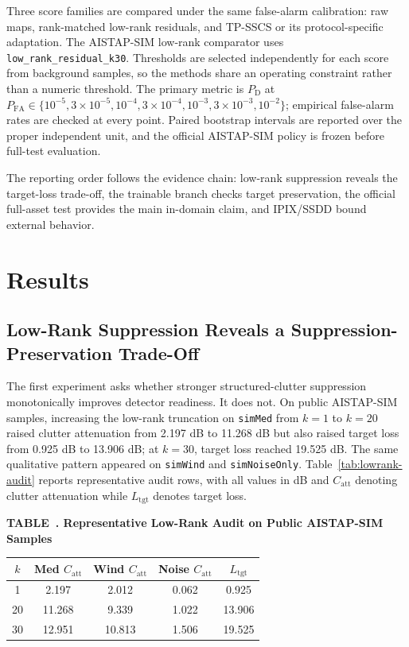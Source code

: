 \documentclass[journal]{IEEEtran}
\newcommand{\SingleColumnTableBlock}[3]{%
  \par\vspace{0.18em}
  \par\noindent\begin{minipage}{\columnwidth}
  \centering
  \refstepcounter{table}\label{#1}%
  {\footnotesize\textbf{TABLE~\thetable. #2}}\\[0.50em]
  #3%
  \end{minipage}
  \par\vspace{0.60em}
}
\begin{document}
Three score families are compared under the same false-alarm calibration: raw maps, rank-matched low-rank residuals, and TP-SSCS or its protocol-specific adaptation. The AISTAP-SIM low-rank comparator uses \texttt{low\_rank\_residual\_k30}. Thresholds are selected independently for each score from background samples, so the methods share an operating constraint rather than a numeric threshold. The primary metric is $P_{\mathrm{D}}$ at $P_{\mathrm{FA}}\in\{10^{-5},3\times10^{-5},10^{-4},3\times10^{-4},10^{-3},3\times10^{-3},10^{-2}\}$; empirical false-alarm rates are checked at every point. Paired bootstrap intervals are reported over the proper independent unit, and the official AISTAP-SIM policy is frozen before full-test evaluation.

The reporting order follows the evidence chain: low-rank suppression reveals the target-loss trade-off, the trainable branch checks target preservation, the official full-asset test provides the main in-domain claim, and IPIX/SSDD bound external behavior.

\section{Results}

\subsection{Low-Rank Suppression Reveals a Suppression-Preservation Trade-Off}

The first experiment asks whether stronger structured-clutter suppression monotonically improves detector readiness. It does not. On public AISTAP-SIM samples, increasing the low-rank truncation on \texttt{simMed} from $k=1$ to $k=20$ raised clutter attenuation from 2.197 dB to 11.268 dB but also raised target loss from 0.925 dB to 13.906 dB; at $k=30$, target loss reached 19.525 dB. The same qualitative pattern appeared on \texttt{simWind} and \texttt{simNoiseOnly}. Table~\ref{tab:lowrank-audit} reports representative audit rows, with all values in dB and $C_{\mathrm{att}}$ denoting clutter attenuation while $L_{\mathrm{tgt}}$ denotes target loss.

\SingleColumnTableBlock{tab:lowrank-audit}{Representative Low-Rank Audit on Public AISTAP-SIM Samples}
{{\scriptsize
\setlength{\tabcolsep}{3.0pt}
\renewcommand{\arraystretch}{1.04}
\begin{tabular}{@{}ccccc@{}}
\toprule
$k$ & Med $C_{\mathrm{att}}$ & Wind $C_{\mathrm{att}}$ & Noise $C_{\mathrm{att}}$ & $L_{\mathrm{tgt}}$ \\
\midrule
1  & 2.197  & 2.012  & 0.062 & 0.925  \\
20 & 11.268 & 9.339  & 1.022 & 13.906 \\
30 & 12.951 & 10.813 & 1.506 & 19.525 \\
\bottomrule
\end{tabular}}
}
\end{document}
